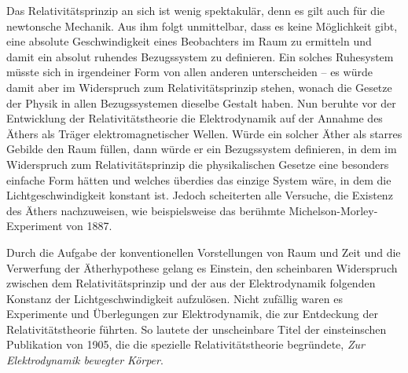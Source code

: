 \documentclass[12pt,a4paper,twoside]{article}
\newenvironment{nohyphens}{%
  \par
  \hyphenpenalty=10000
  \exhyphenpenalty=10000
  \sloppy
}{\par}
\begin{document}
\begin{nohyphens}
Das Relativitätsprinzip an sich ist wenig spektakulär, denn es gilt auch für die newtonsche Mechanik. Aus ihm folgt unmittelbar, dass es keine Möglichkeit gibt, eine absolute Geschwindigkeit eines Beobachters im Raum zu ermitteln und damit ein absolut ruhendes Bezugssystem zu definieren. Ein solches Ruhesystem müsste sich in irgendeiner Form von allen anderen unterscheiden – es würde damit aber im Widerspruch zum Relativitätsprinzip stehen, wonach die Gesetze der Physik in allen Bezugssystemen dieselbe Gestalt haben. Nun beruhte vor der Entwicklung der Relativitätstheorie die Elektrodynamik auf der Annahme des Äthers als Träger elektromagnetischer Wellen. Würde ein solcher Äther als starres Gebilde den Raum füllen, dann würde er ein Bezugssystem definieren, in dem im Widerspruch zum Relativitätsprinzip die physikalischen Gesetze eine besonders einfache Form hätten und welches überdies das einzige System wäre, in dem die Lichtgeschwindigkeit konstant ist. Jedoch scheiterten alle Versuche, die Existenz des Äthers nachzuweisen, wie beispielsweise das berühmte Michelson-Morley-Experiment von 1887.

Durch die Aufgabe der konventionellen Vorstellungen von Raum und Zeit und die Verwerfung der Ätherhypothese gelang es Einstein, den scheinbaren Widerspruch zwischen dem Relativitätsprinzip und der aus der Elektrodynamik folgenden Konstanz der Lichtgeschwindigkeit aufzulösen. Nicht zufällig waren es Experimente und Überlegungen zur Elektrodynamik, die zur Entdeckung der Relativitätstheorie führten. So lautete der unscheinbare Titel der einsteinschen Publikation von 1905, die die spezielle Relativitätstheorie begründete, \textit{Zur Elektrodynamik bewegter Körper}.

\end{nohyphens}
\end{document}
